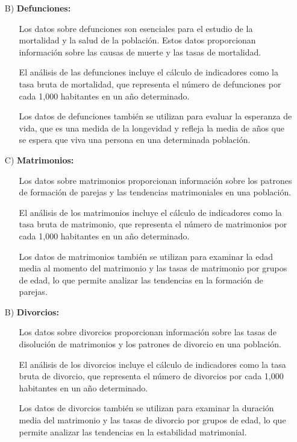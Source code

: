 \documentclass[8pt,a4paper]{beamer}
\begin{document}
{\begin{frame}{}
\begin{block}{}
\begin{enumerate}
\item[B)] \textbf{Defunciones:}
\begin{itemize}
\justifying
\item[\ding{75}] Los datos sobre defunciones son esenciales para el estudio de la mortalidad y la salud de la población. Estos datos proporcionan información sobre las causas de muerte y las tasas de mortalidad.
\item[\ding{75}] El análisis de las defunciones incluye el cálculo de indicadores como la tasa bruta de mortalidad, que representa el número de defunciones por cada 1,000 habitantes en un año determinado.
\item[\ding{75}] Los datos de defunciones también se utilizan para evaluar la esperanza de vida, que es una medida de la longevidad y refleja la media de años que se espera que viva una persona en una determinada población.
\end{itemize}
\item[C)] \textbf{Matrimonios:}
\begin{itemize}
\justifying
\item[\ding{75}] Los datos sobre matrimonios proporcionan información sobre los patrones de formación de parejas y las tendencias matrimoniales en una población.
\item[\ding{75}] El análisis de los matrimonios incluye el cálculo de indicadores como la tasa bruta de matrimonio, que representa el número de matrimonios por cada 1,000 habitantes en un año determinado.
\item[\ding{75}] Los datos de matrimonios también se utilizan para examinar la edad media al momento del matrimonio y las tasas de matrimonio por grupos de edad, lo que permite analizar las tendencias en la formación de parejas.
\end{itemize}
\end{enumerate}
\end{block}
\end{frame}


\begin{frame}{}
\begin{block}{}
\justifying

\begin{enumerate}
\item[B)] \textbf{Divorcios:}
\begin{itemize}
\justifying
\item[\ding{75}] Los datos sobre divorcios proporcionan información sobre las tasas de disolución de matrimonios y los patrones de divorcio en una población.
\item[\ding{75}] El análisis de los divorcios incluye el cálculo de indicadores como la tasa bruta de divorcio, que representa el número de divorcios por cada 1,000 habitantes en un año determinado.
\item[\ding{75}] Los datos de divorcios también se utilizan para examinar la duración media del matrimonio y las tasas de divorcio por grupos de edad, lo que permite analizar las tendencias en la estabilidad matrimonial.
\end{itemize}


\end{enumerate}
\end{block}
\end{frame}}
\end{document}

